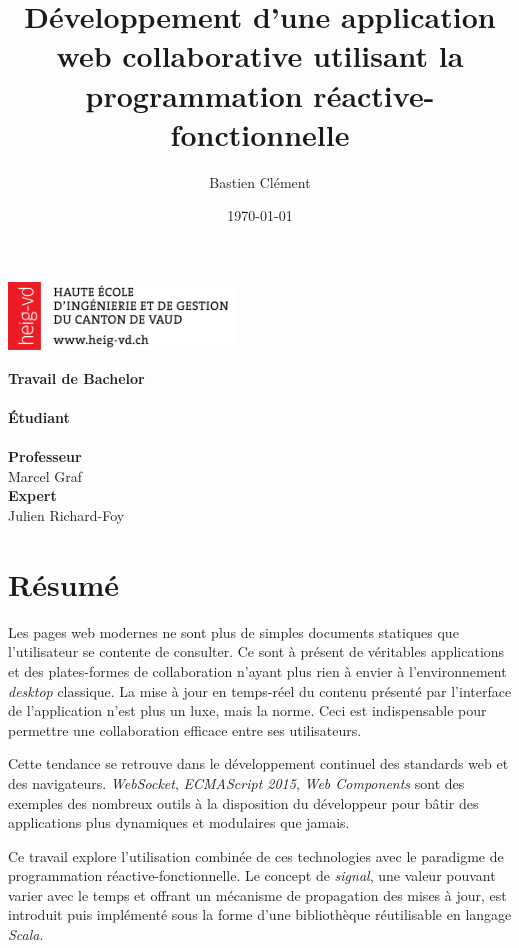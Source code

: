\documentclass[11pt, a4paper, twoside, frenchb]{book}
\title{Développement d'une application web collaborative utilisant la programmation réactive-fonctionnelle}
\author{Bastien Clément}
\date{\today}
\begin{document}
\frontmatter

\makeatletter
\begin{titlepage}
	\includegraphics[width=6cm]{img/heigvd.png}\\[25ex]
	\begin{center}
		{\normalsize \bfseries Travail de Bachelor}\\[2ex]
		{\LARGE \@title }\\[20ex]
		{\normalsize \bfseries Étudiant}\\[1ex]
		{\large \@author}\\[3ex]
		{\normalsize \bfseries Professeur}\\[1ex]
		{\large Marcel Graf}\\[3ex] 
		{\normalsize \bfseries Expert}\\[1ex]
		{\large Julien Richard-Foy}\\[25ex]
		{\normalsize \@date}
	\end{center}
\end{titlepage}
\makeatother
\thispagestyle{empty}
\setcounter{page}{0}

\chapter*{Résumé}

Les pages web modernes ne sont plus de simples documents statiques que l'utilisateur se contente de consulter. Ce sont à présent de véritables applications et des plates-formes de collaboration n'ayant plus rien à envier à l'environnement \emph{desktop} classique. La mise à jour en temps-réel du contenu présenté par l'interface de l'application n'est plus un luxe, mais la norme. Ceci est indispensable pour permettre une collaboration efficace entre ses utilisateurs.

Cette tendance se retrouve dans le développement continuel des standards web et des navigateurs. \emph{WebSocket}, \emph{ECMAScript 2015}, \emph{Web Components} sont des exemples des nombreux outils à la disposition du développeur pour bâtir des applications plus dynamiques et modulaires que jamais.

Ce travail explore l'utilisation combinée de ces technologies avec le paradigme de programmation réactive-fonctionnelle. Le concept de \emph{signal}, une valeur pouvant varier avec le temps et offrant un mécanisme de propagation des mises à jour, est introduit puis implémenté sous la forme d'une bibliothèque réutilisable en langage \emph{Scala}. 
\end{document}
